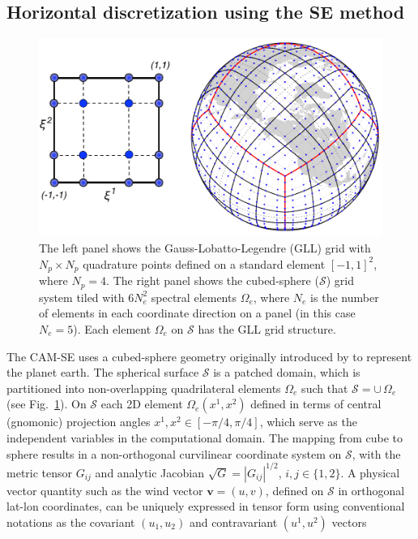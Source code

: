 \documentclass{agujournal}
\begin{document}
\subsection{Horizontal discretization using the SE method}
  \begin{figure}[h]
\centering
 \includegraphics[scale=0.75]{figs/cs_gll4_2017}
 \caption{The left panel shows the  Gauss-Lobatto-Legendre (GLL)   grid with $ N_p \times  N_p$ quadrature points defined
 on a standard element $[-1,1]^2$, where $N_p=4$. The right panel shows the cubed-sphere ($\mathcal{S}$) grid system tiled with 
 $6 N_e^2 $ spectral elements $\Omega_e$, where $N_e$ is the number of elements  in each coordinate direction
 on a panel (in this case $N_e=5$). 
 Each element  $\Omega_e$ on $\mathcal{S}$ has the GLL grid structure.  }
 \label{fig:gll4}
\end{figure}
    The CAM-SE 
 uses a cubed-sphere geometry  originally introduced by \cite{S1972MWR}  to represent the planet earth. The  spherical   surface 
  $\mathcal{S}$ is  a patched domain,  which is partitioned  into   non-overlapping quadrilateral elements 
 $\Omega_e$ such that $\mathcal{S} = \cup \, \Omega_e$ (see Fig.~\ref{fig:gll4}). 
  On   $\mathcal{S}$  each 2D  element $\Omega_e(x^1,x^2)$  defined in terms of
 central  (gnomonic) projection angles $x^1,x^2 \in [-\pi/4, \pi/4]$, which serve as  the independent variables in the computational domain. 
 The mapping from cube to sphere results in a non-orthogonal curvilinear  coordinate system on $\mathcal{S}$, with 
 the  metric tensor $G_{ij}$ and  analytic Jacobian $ \sqrt{G} =  |G_{ij}|^{1/2}$, $i, j \in \{1,2\}$. 
 A  physical vector quantity  such as the wind vector $\mathbf{v} = (u,v)$,  defined on  $\mathcal{S}$
 in  orthogonal lat-lon coordinates,  can  be uniquely
 expressed in tensor form using conventional notations as the covariant $(u_1,u_2)$ and contravariant  $(u^1, u^2)$ vectors 
\end{document}
